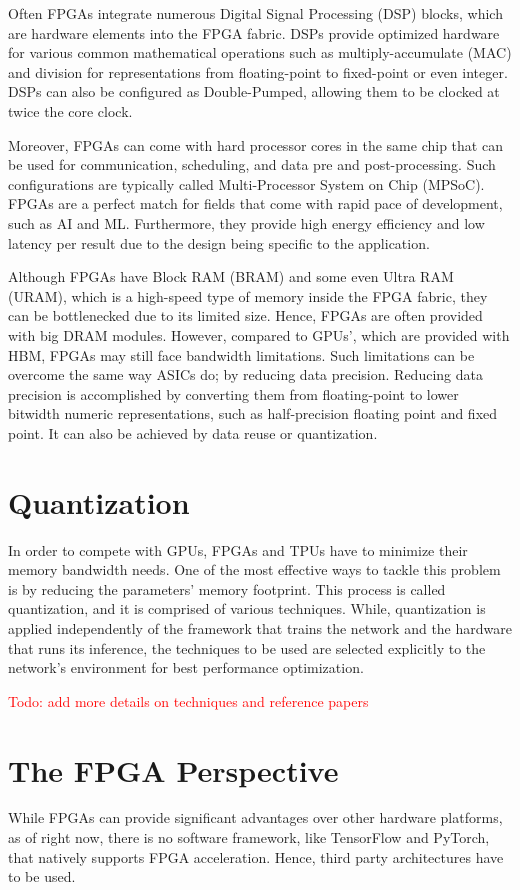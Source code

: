 Often FPGAs integrate numerous Digital Signal Processing (DSP) blocks, which are hardware elements into the FPGA fabric. DSPs provide optimized hardware for various common mathematical operations such as multiply-accumulate (MAC) and division for representations from floating-point to fixed-point or even integer. DSPs can also be configured as Double-Pumped, allowing them to be clocked at twice the core clock.

Moreover, FPGAs can come with hard processor cores in the same chip that can be used for communication, scheduling, and data pre and post-processing. Such configurations are typically called Multi-Processor System on Chip (MPSoC). FPGAs are a perfect match for fields that come with rapid pace of development, such as AI and ML. Furthermore, they provide high energy efficiency and low latency per result due to the design being specific to the application.

Although FPGAs have Block RAM (BRAM) and some even Ultra RAM (URAM), which is a high-speed type of memory inside the FPGA fabric, they can be bottlenecked due to its limited size. Hence, FPGAs are often provided with big DRAM modules. However, compared to GPUs', which are provided with HBM, FPGAs may still face bandwidth limitations. Such limitations can be overcome the same way ASICs do; by reducing data precision. Reducing data precision is accomplished by converting them from floating-point to lower bitwidth numeric representations, such as half-precision floating point and fixed point. It can also be achieved by data reuse or quantization.

\section{Quantization}
In order to compete with GPUs, FPGAs and TPUs have to minimize their memory bandwidth needs. One of the most effective ways to tackle this problem is by reducing the parameters' memory footprint. This process is called quantization, and it is comprised of various techniques. While, quantization is applied independently of the framework that trains the network and the hardware that runs its inference, the techniques to be used are selected explicitly to the network's environment for best performance optimization.

\textcolor{red}{
Todo: add more details on techniques and reference papers
}

\section{The FPGA Perspective}
While FPGAs can provide significant advantages over other hardware platforms, as of right now, there is no software framework, like TensorFlow and PyTorch, that natively supports FPGA acceleration. Hence, third party architectures have to be used.

